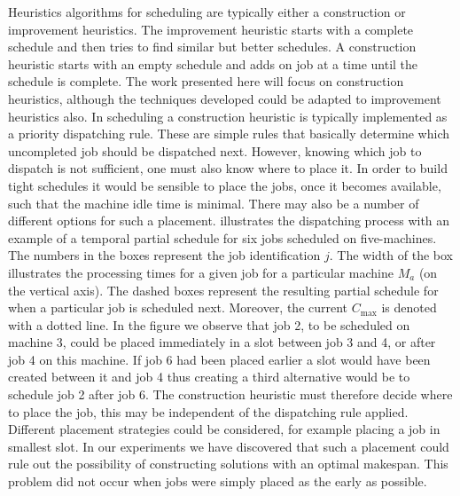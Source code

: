 \documentclass[smallextended]{svjour3}
\begin{document}
	Heuristics algorithms for scheduling are typically either a construction or improvement heuristics. The improvement heuristic starts with a complete schedule and then tries to find similar but better schedules.
	A construction heuristic starts with an empty schedule and adds on job at a time until the schedule is complete.
	The work presented here will focus on construction heuristics, although the techniques developed could be adapted to improvement heuristics also. In scheduling a construction heuristic is typically implemented as a priority dispatching rule. These are simple rules that basically determine which uncompleted job should be dispatched next. However, knowing which job to dispatch is not sufficient, one must also know where to place it. In order to build tight schedules it would be sensible to place the jobs, once it becomes available, such that the machine idle time is minimal. There may also be a number of different options for such a placement.  illustrates the dispatching process with an example of a temporal partial schedule for six jobs scheduled on five-machines. The numbers in the boxes represent the job identification $j$. The width of the box illustrates the processing times for a given job for a particular machine $M_a$ (on the vertical axis). The dashed boxes represent the resulting partial schedule for when a particular job is scheduled next. Moreover, the current $C_{\max}$ is denoted with a dotted line. In the figure we observe that job 2, to be scheduled on machine 3, could be placed immediately in a slot between job 3 and 4, or after job 4 on this machine. If job 6 had been placed earlier a slot would have been created between it and job 4 thus creating a third alternative would be to schedule job 2 after job 6. The construction heuristic must therefore decide where to place the job, this may be independent of the dispatching rule applied. Different placement strategies could be considered, for example placing a job in smallest slot. In our experiments we have discovered that such a placement could rule out the possibility of constructing solutions with an optimal makespan. This problem did not occur when jobs were simply placed as the early as possible.
	
\end{document}

